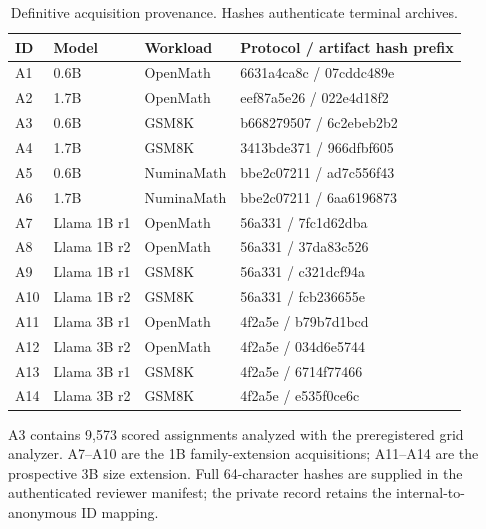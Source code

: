 \documentclass{article}
\begin{document}
\begin{table}[t]
\caption{Definitive acquisition provenance. Hashes authenticate terminal archives.}
\label{tab:prov}
\centering\scriptsize
\begin{tabular}{llll}
\toprule
ID & Model & Workload & Protocol / artifact hash prefix \\
\midrule
A1 & 0.6B & OpenMath & 6631a4ca8c / 07cddc489e \\
A2 & 1.7B & OpenMath & eef87a5e26 / 022e4d18f2 \\
A3 & 0.6B & GSM8K & b668279507 / 6c2ebeb2b2 \\
A4 & 1.7B & GSM8K & 3413bde371 / 966dfbf605 \\
A5 & 0.6B & NuminaMath & bbe2c07211 / ad7c556f43 \\
A6 & 1.7B & NuminaMath & bbe2c07211 / 6aa6196873 \\
A7 & Llama 1B r1 & OpenMath & 56a331 / 7fc1d62dba \\
A8 & Llama 1B r2 & OpenMath & 56a331 / 37da83c526 \\
A9 & Llama 1B r1 & GSM8K & 56a331 / c321dcf94a \\
A10 & Llama 1B r2 & GSM8K & 56a331 / fcb236655e \\
A11 & Llama 3B r1 & OpenMath & 4f2a5e / b79b7d1bcd \\
A12 & Llama 3B r2 & OpenMath & 4f2a5e / 034d6e5744 \\
A13 & Llama 3B r1 & GSM8K & 4f2a5e / 6714f77466 \\
A14 & Llama 3B r2 & GSM8K & 4f2a5e / e535f0ce6c \\
\bottomrule
\end{tabular}
\end{table}

A3 contains 9,573 scored assignments analyzed with the preregistered grid analyzer. A7--A10 are the 1B family-extension acquisitions; A11--A14 are the prospective 3B size extension. Full 64-character hashes are supplied in the authenticated reviewer manifest; the private record retains the internal-to-anonymous ID mapping.
\end{document}
